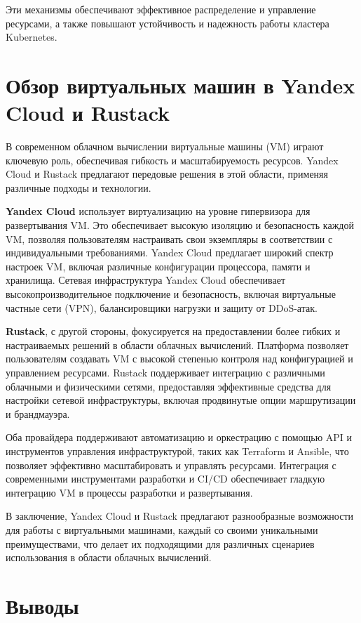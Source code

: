 Эти механизмы обеспечивают эффективное распределение и управление ресурсами, а
также повышают устойчивость и надежность работы кластера Kubernetes.

\section*{Обзор виртуальных машин в Yandex Cloud и Rustack}

В современном облачном вычислении виртуальные машины (VM) играют ключевую роль,
обеспечивая гибкость и масштабируемость ресурсов. Yandex Cloud и Rustack
предлагают передовые решения в этой области, применяя различные подходы и
технологии.

\textbf{Yandex Cloud}\cite{yandexcloud} использует виртуализацию на уровне
гипервизора для
развертывания VM. Это обеспечивает высокую изоляцию и безопасность каждой VM,
позволяя пользователям настраивать свои экземпляры в соответствии с
индивидуальными требованиями. Yandex Cloud предлагает широкий спектр настроек
VM, включая различные конфигурации процессора, памяти и хранилища. Сетевая
инфраструктура Yandex Cloud обеспечивает высокопроизводительное подключение и
безопасность, включая виртуальные частные сети (VPN), балансировщики нагрузки и
защиту от DDoS-атак.

\textbf{Rustack}\cite{rustack}, с другой стороны, фокусируется на предоставлении
более гибких
и настраиваемых решений в области облачных вычислений. Платформа позволяет
пользователям создавать VM с высокой степенью контроля над конфигурацией и
управлением ресурсами. Rustack поддерживает интеграцию с различными облачными и
физическими сетями, предоставляя эффективные средства для настройки сетевой
инфраструктуры, включая продвинутые опции маршрутизации и брандмауэра.

Оба провайдера поддерживают автоматизацию и оркестрацию с помощью API и
инструментов управления инфраструктурой, таких как Terraform и Ansible, что
позволяет эффективно масштабировать и управлять ресурсами. Интеграция с
современными инструментами разработки и CI/CD обеспечивает гладкую интеграцию VM
в процессы разработки и развертывания.

В заключение, Yandex Cloud и Rustack предлагают разнообразные возможности для
работы с виртуальными машинами, каждый со своими уникальными преимуществами, что
делает их подходящими для различных сценариев использования в области облачных
вычислений.

\section{Выводы}

